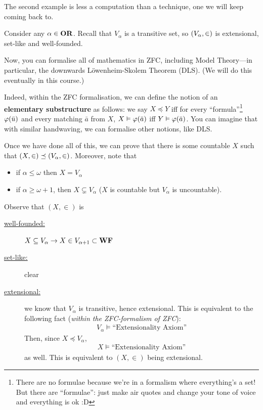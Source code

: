 The second example is less a computation than a technique, one we will keep coming back to.

\begin{boxexample}[ZFC]
    Consider any $\alpha \in \mathbf{OR}$. Recall that $V_{\alpha}$ is a transitive set, so $\left( V_{\alpha}, \in \right)$ is extensional, set-like and well-founded.

    Now, you can formalise all of mathematics in ZFC, including Model Theory---in particular, the downwards Löwenheim-Skolem Theorem (DLS). (We will do this eventually in this course.)

    Indeed, within the ZFC formalisation, we can define the notion of an \textbf{elementary substructure} as follows: we say $X \preceq Y$ iff for every ``formula''\footnote{There are no formulae because we're in a formalism where everything's a set! But there are ``formulae'': just make air quotes and change your tone of voice and everything is ok :D} $\varphi\!\left( \bar{u} \right)$ and every matching $\bar{a}$ from $X$, $X \vDash \varphi\!\left( \bar{a} \right)$ iff $Y \vDash \varphi\!\left( \bar{a} \right)$. You can imagine that with similar handwaving, we can formalise other notions, like DLS.

    Once we have done all of this, we can prove that there is some countable $X$ such that $(X, \in) \preceq \left( V_{\alpha}, \in \right)$. Moreover, note that
    \begin{itemize}
        \item if $\alpha \leq \omega$ then $X = V_{\alpha}$
        \item if $\alpha \geq \omega + 1$, then $X \subsetneq V_{\alpha}$ ($X$ is countable but $V_{\alpha}$ is uncountable).
    \end{itemize}
    Observe that $(X, \in)$ is
    \begin{description}
        \item[\underline{well-founded:}] $X \subseteq V_{\alpha} \to X \in V_{\alpha + 1} \subset \mathbf{WF}$

        \item[\underline{set-like:}] clear

        \item[\underline{extensional:}] we know that $V_{\alpha}$ is transitive, hence extensional. This is equivalent to the following fact (\textit{within the ZFC-formalism of ZFC}):
        \begin{align*}
            V_{\alpha} \models \text{``Extensionality Axiom''}
        \end{align*}
        Then, since $X \preceq V_{\alpha}$,
        \begin{align*}
            X \models \text{``Extensionality Axiom''}
        \end{align*}
        as well. This is equivalent to $(X, \in)$ being extensional.


\end{description}
\end{boxexample}
